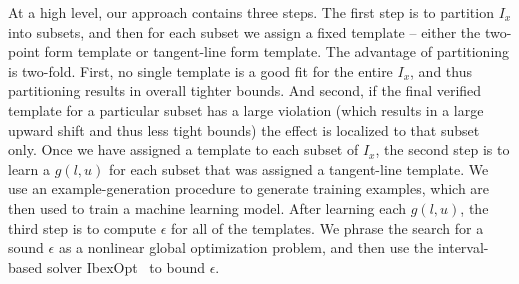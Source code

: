 %
At a high level, our approach contains three steps.
The first step is to partition $ I_x $ into subsets, and then for each
subset we assign a fixed template -- either the two-point form template or
tangent-line form template.
%
The advantage of partitioning is two-fold. First, no single template is a
good fit for the entire $ I_x $, and thus partitioning results in overall
tighter bounds.
%
And second, if the final verified template for a particular
subset has a large violation (which results in a large upward shift and thus
less tight bounds) the effect is localized to that subset only.
Once we have assigned a template to each subset of $ I_x $, the second step is
to learn a $ g(l, u) $ for each subset that was assigned a tangent-line
template. We use an example-generation procedure to generate training examples,
which are then used to train a machine learning model.
%
After learning each $ g(l, u) $, the third step is to compute $ \epsilon $ for
all of the templates. We phrase the search for a sound $ \epsilon $ as a
nonlinear global optimization problem, and then use the interval-based solver
IbexOpt~\cite{chabert2009contractor} to bound $ \epsilon $.




